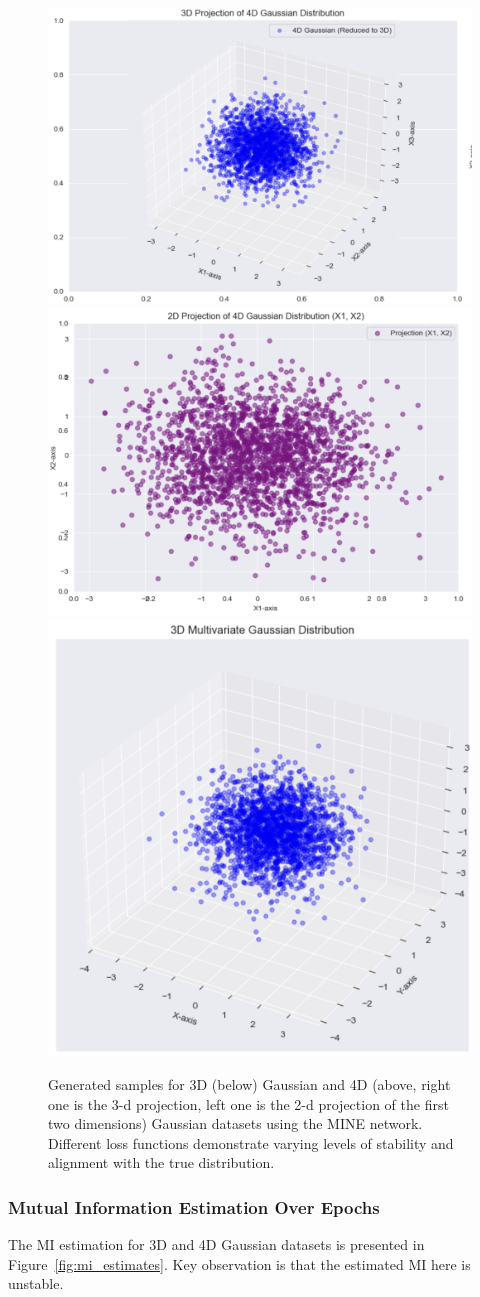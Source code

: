 \documentclass[lettersize,journal]{IEEEtran}
\begin{document}
\begin{figure}[h]
    \centering
    \includegraphics[width=0.45\linewidth]{figures/4d_gaussian_samples_1.png}
    \includegraphics[width=0.45\linewidth]{figures/4d_gaussian_samples_2.png}
    \includegraphics[width=0.45\linewidth]{figures/3d_gaussian_samples.png}
    \caption{Generated samples for 3D (below) Gaussian and 4D (above, right one is the 3-d projection, left one is the 2-d projection of the first two dimensions) Gaussian datasets using the MINE network. Different loss functions demonstrate varying levels of stability and alignment with the true distribution.}
    \label{fig:gaussian_samples}
\end{figure}

\subsubsection{Mutual Information Estimation Over Epochs}
The MI estimation for 3D and 4D Gaussian datasets is presented in Figure~\ref{fig:mi_estimates}. Key observation is that the estimated MI here is unstable.
\end{document}

